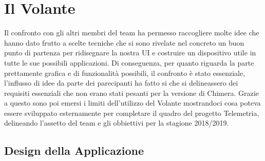 \chapter{Il Volante}


Il confronto con gli altri membri del team ha permesso raccogliere molte idee che hanno dato frutto
a scelte tecniche che si sono rivelate nel concreto un buon punto di partenza per ridisegnare la nostra 
UI e costruire un dispositivo utile in tutte le sue possibili applicazioni.
Di conseguenza, per quanto riguarda la parte prettamente grafica e di funzionalità possibili, il confronto
è stato essenziale, l'influsso di idee da parte dei parecipanti ha fatto si che si delineassero dei requisiti
essenziali che non erano stati pesanti per la versione di Chimera.
Grazie a questo sono poi emersi i limiti dell'utilizzo del Volante mostrandoci cosa poteva essere sviluppato esternamente
per completare il quadro del progetto Telemetria, delineando l'assetto del team e gli obbiettivi per la stagione 2018/2019.

\section{Design della Applicazione}


